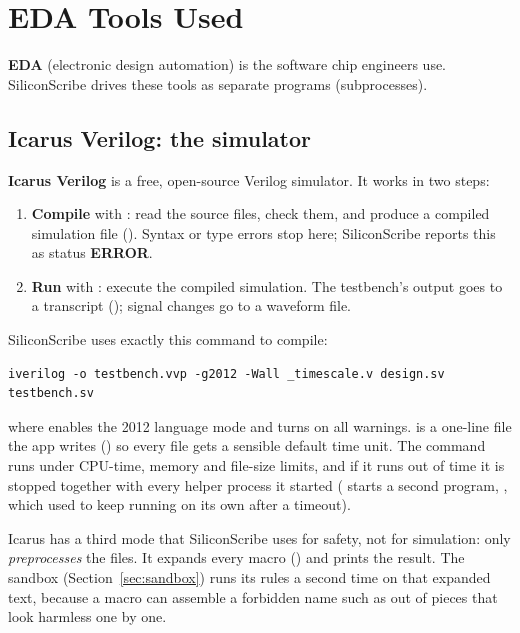 \chapter{EDA Tools Used}
\label{ch:tools}

\textbf{EDA} (electronic design automation) is the software chip engineers use. SiliconScribe drives these tools as separate programs (subprocesses).

\section{Icarus Verilog: the simulator}

\textbf{Icarus Verilog} is a free, open-source Verilog simulator. It works in two steps:

\begin{enumerate}
  \item \textbf{Compile} with : read the source files, check them, and produce a compiled simulation file (). Syntax or type errors stop here; SiliconScribe reports this as status \textbf{ERROR}.
  \item \textbf{Run} with : execute the compiled simulation. The testbench's  output goes to a transcript (); signal changes go to a waveform file.
\end{enumerate}

SiliconScribe uses exactly this command to compile:
\begin{lstlisting}[style=plain]
iverilog -o testbench.vvp -g2012 -Wall _timescale.v design.sv testbench.sv
\end{lstlisting}
where  enables the 2012 language mode and  turns on all warnings.  is a one-line file the app writes () so every file gets a sensible default time unit. The command runs under CPU-time, memory and file-size limits, and if it runs out of time it is stopped together with every helper process it started ( starts a second program, , which used to keep running on its own after a timeout).

Icarus has a third mode that SiliconScribe uses for safety, not for simulation:  only \emph{preprocesses} the files. It expands every macro () and prints the result. The sandbox (Section~\ref{sec:sandbox}) runs its rules a second time on that expanded text, because a macro can assemble a forbidden name such as  out of pieces that look harmless one by one.

